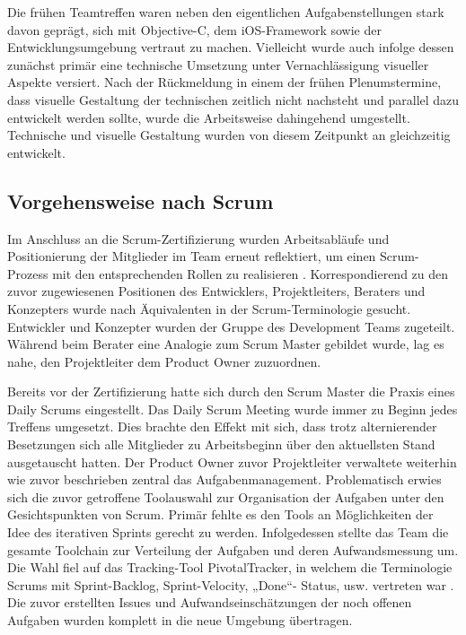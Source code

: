 	Die frühen Teamtreffen waren neben den eigentlichen Aufgabenstellungen stark davon geprägt, sich mit Objective-C, dem iOS-Framework sowie der Entwicklungsumgebung vertraut zu machen. Vielleicht wurde auch infolge dessen zunächst primär eine technische Umsetzung unter Vernachlässigung visueller Aspekte versiert. Nach der Rückmeldung in einem der frühen Plenumstermine, dass visuelle Gestaltung der technischen zeitlich nicht nachsteht und parallel dazu entwickelt werden sollte, wurde die Arbeitsweise dahingehend umgestellt. Technische und visuelle Gestaltung wurden von diesem Zeitpunkt an gleichzeitig entwickelt. 

\subsection{Vorgehensweise nach Scrum}
	Im Anschluss an die Scrum-Zertifizierung wurden Arbeitsabläufe und Positionierung der Mitglieder im Team erneut reflektiert, um einen Scrum-Prozess mit den entsprechenden Rollen zu realisieren \citep{ScrumGuideIntro13}. Korrespondierend zu den zuvor zugewiesenen Positionen des Entwicklers, Projektleiters, Beraters und Konzepters wurde nach Äquivalenten in der Scrum-Terminologie gesucht. Entwickler und Konzepter wurden der Gruppe des Development Teams zugeteilt. Während beim Berater eine Analogie zum Scrum Master gebildet wurde, lag es nahe, den Projektleiter dem Product Owner zuzuordnen. 

	Bereits vor der Zertifizierung hatte sich durch den Scrum Master die Praxis eines Daily Scrums eingestellt. Das Daily Scrum Meeting wurde immer zu Beginn jedes Treffens umgesetzt. Dies brachte den Effekt mit sich, dass trotz alternierender Besetzungen sich alle Mitglieder zu Arbeitsbeginn über den aktuellsten Stand ausgetauscht hatten. Der Product Owner zuvor Projektleiter verwaltete weiterhin wie zuvor beschrieben zentral das Aufgabenmanagement. 
Problematisch erwies sich die zuvor getroffene Toolauswahl zur Organisation der Aufgaben unter den Gesichtspunkten von Scrum. Primär fehlte es den Tools an Möglichkeiten der Idee des iterativen Sprints gerecht zu werden. Infolgedessen stellte das Team die gesamte Toolchain zur Verteilung der Aufgaben und deren Aufwandsmessung um. Die Wahl fiel auf das Tracking-Tool PivotalTracker, in welchem die Terminologie Scrums mit Sprint-Backlog, Sprint-Velocity, „Done“- Status, usw. vertreten war \citep{PivotalTracker14}. Die zuvor erstellten Issues und Aufwandseinschätzungen der noch offenen Aufgaben wurden komplett in die neue Umgebung übertragen.

